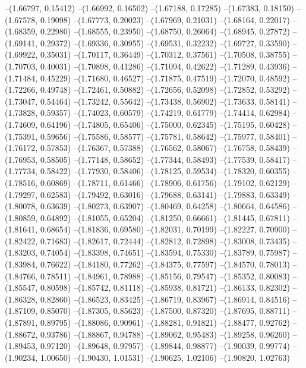 --(1.66797, 0.15412)
--(1.66992, 0.16502)
--(1.67188, 0.17285)
--(1.67383, 0.18150)
--(1.67578, 0.19098)
--(1.67773, 0.20023)
--(1.67969, 0.21031)
--(1.68164, 0.22017)
--(1.68359, 0.22980)
--(1.68555, 0.23950)
--(1.68750, 0.26064)
--(1.68945, 0.27872)
--(1.69141, 0.29372)
--(1.69336, 0.30955)
--(1.69531, 0.32232)
--(1.69727, 0.33590)
--(1.69922, 0.35031)
--(1.70117, 0.36449)
--(1.70312, 0.37561)
--(1.70508, 0.38755)
--(1.70703, 0.40031)
--(1.70898, 0.41286)
--(1.71094, 0.42622)
--(1.71289, 0.43936)
--(1.71484, 0.45229)
--(1.71680, 0.46527)
--(1.71875, 0.47519)
--(1.72070, 0.48592)
--(1.72266, 0.49748)
--(1.72461, 0.50882)
--(1.72656, 0.52098)
--(1.72852, 0.53292)
--(1.73047, 0.54464)
--(1.73242, 0.55642)
--(1.73438, 0.56902)
--(1.73633, 0.58141)
--(1.73828, 0.59357)
--(1.74023, 0.60579)
--(1.74219, 0.61779)
--(1.74414, 0.62984)
--(1.74609, 0.64196)
--(1.74805, 0.65406)
--(1.75000, 0.62345)
--(1.75195, 0.60428)
--(1.75391, 0.59656)
--(1.75586, 0.58577)
--(1.75781, 0.58642)
--(1.75977, 0.58401)
--(1.76172, 0.57853)
--(1.76367, 0.57388)
--(1.76562, 0.58067)
--(1.76758, 0.58439)
--(1.76953, 0.58505)
--(1.77148, 0.58652)
--(1.77344, 0.58493)
--(1.77539, 0.58417)
--(1.77734, 0.58422)
--(1.77930, 0.58406)
--(1.78125, 0.59534)
--(1.78320, 0.60355)
--(1.78516, 0.60869)
--(1.78711, 0.61466)
--(1.78906, 0.61756)
--(1.79102, 0.62129)
--(1.79297, 0.62583)
--(1.79492, 0.63016)
--(1.79688, 0.63141)
--(1.79883, 0.63349)
--(1.80078, 0.63639)
--(1.80273, 0.63907)
--(1.80469, 0.64258)
--(1.80664, 0.64586)
--(1.80859, 0.64892)
--(1.81055, 0.65204)
--(1.81250, 0.66661)
--(1.81445, 0.67811)
--(1.81641, 0.68654)
--(1.81836, 0.69580)
--(1.82031, 0.70199)
--(1.82227, 0.70900)
--(1.82422, 0.71683)
--(1.82617, 0.72444)
--(1.82812, 0.72898)
--(1.83008, 0.73435)
--(1.83203, 0.74054)
--(1.83398, 0.74651)
--(1.83594, 0.75330)
--(1.83789, 0.75987)
--(1.83984, 0.76622)
--(1.84180, 0.77262)
--(1.84375, 0.77597)
--(1.84570, 0.78013)
--(1.84766, 0.78511)
--(1.84961, 0.78988)
--(1.85156, 0.79547)
--(1.85352, 0.80083)
--(1.85547, 0.80598)
--(1.85742, 0.81118)
--(1.85938, 0.81721)
--(1.86133, 0.82302)
--(1.86328, 0.82860)
--(1.86523, 0.83425)
--(1.86719, 0.83967)
--(1.86914, 0.84516)
--(1.87109, 0.85070)
--(1.87305, 0.85623)
--(1.87500, 0.87320)
--(1.87695, 0.88711)
--(1.87891, 0.89795)
--(1.88086, 0.90961)
--(1.88281, 0.91821)
--(1.88477, 0.92762)
--(1.88672, 0.93786)
--(1.88867, 0.94788)
--(1.89062, 0.95483)
--(1.89258, 0.96260)
--(1.89453, 0.97120)
--(1.89648, 0.97957)
--(1.89844, 0.98877)
--(1.90039, 0.99774)
--(1.90234, 1.00650)
--(1.90430, 1.01531)
--(1.90625, 1.02106)
--(1.90820, 1.02763)
